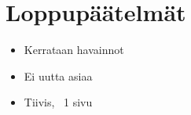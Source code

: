 \chapter{Loppupäätelmät}

\begin{itemize}
  \item Kerrataan havainnot
  \item Ei uutta asiaa
  \item Tiivis, ~1 sivu
\end{itemize}